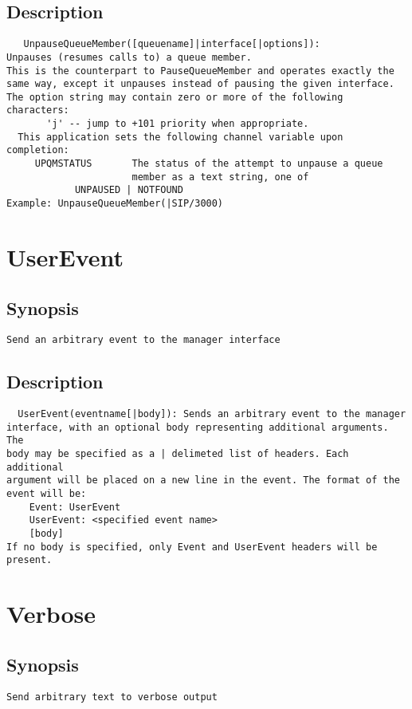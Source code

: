 \subsection{Description}
\begin{verbatim}
   UnpauseQueueMember([queuename]|interface[|options]):
Unpauses (resumes calls to) a queue member.
This is the counterpart to PauseQueueMember and operates exactly the
same way, except it unpauses instead of pausing the given interface.
The option string may contain zero or more of the following characters:
       'j' -- jump to +101 priority when appropriate.
  This application sets the following channel variable upon completion:
     UPQMSTATUS       The status of the attempt to unpause a queue 
                      member as a text string, one of
            UNPAUSED | NOTFOUND
Example: UnpauseQueueMember(|SIP/3000)

\end{verbatim}


\section{UserEvent}
\subsection{Synopsis}
\begin{verbatim}
Send an arbitrary event to the manager interface
\end{verbatim}
\subsection{Description}
\begin{verbatim}
  UserEvent(eventname[|body]): Sends an arbitrary event to the manager
interface, with an optional body representing additional arguments.  The
body may be specified as a | delimeted list of headers. Each additional
argument will be placed on a new line in the event. The format of the
event will be:
    Event: UserEvent
    UserEvent: <specified event name>
    [body]
If no body is specified, only Event and UserEvent headers will be present.

\end{verbatim}


\section{Verbose}
\subsection{Synopsis}
\begin{verbatim}
Send arbitrary text to verbose output
\end{verbatim}
